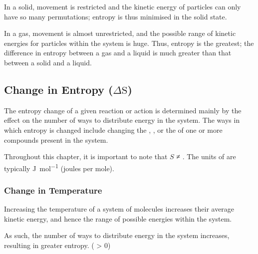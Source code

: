 		In a solid, movement is restricted and the kinetic energy of particles can only have so many permutations; entropy is thus minimised in the
		solid state.

		In a gas, movement is almost unrestricted, and the possible range of kinetic energies for particles within the system is huge. Thus,
		entropy is the greatest; the difference in entropy between a gas and a liquid is much greater than that between a solid and a liquid.


		\subsection{Change in Entropy (\texorpdfstring{$\Delta \mathrm{S}$)}{\Delta S}}

			The entropy change of a given reaction or action is determined mainly by the effect on the number of ways to distribute energy in the
			system. The ways in which entropy is changed include changing the , , or the
			 of one or more compounds present in the system.

			Throughout this chapter, it is important to note that $S$ ≠ \entr{}. The units of \entr{} are typically \si{\joule\per\mole} (joules per mole).

			\subsubsection{Change in Temperature}

				Increasing the temperature of a system of molecules increases their average kinetic energy, and hence the range of possible
				energies within the system.

				As such, the number of ways to distribute energy in the system increases, resulting in greater entropy. (\entr{} > 0)


